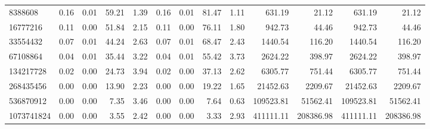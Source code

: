 \begin{tabular}{lrrrrrrrrrrrr}
8388608 & 0.16 & 0.01 & 59.21 & 1.39 & 0.16 & 0.01 & 81.47 & 1.11 & 631.19 & 21.12 & 631.19 & 21.12 \\
16777216 & 0.11 & 0.00 & 51.84 & 2.15 & 0.11 & 0.00 & 76.11 & 1.80 & 942.73 & 44.46 & 942.73 & 44.46 \\
33554432 & 0.07 & 0.01 & 44.24 & 2.63 & 0.07 & 0.01 & 68.47 & 2.43 & 1440.54 & 116.20 & 1440.54 & 116.20 \\
67108864 & 0.04 & 0.01 & 35.44 & 3.22 & 0.04 & 0.01 & 55.42 & 3.73 & 2624.22 & 398.97 & 2624.22 & 398.97 \\
134217728 & 0.02 & 0.00 & 24.73 & 3.94 & 0.02 & 0.00 & 37.13 & 2.62 & 6305.77 & 751.44 & 6305.77 & 751.44 \\
268435456 & 0.00 & 0.00 & 13.90 & 2.23 & 0.00 & 0.00 & 19.22 & 1.65 & 21452.63 & 2209.67 & 21452.63 & 2209.67 \\
536870912 & 0.00 & 0.00 & 7.35 & 3.46 & 0.00 & 0.00 & 7.64 & 0.63 & 109523.81 & 51562.41 & 109523.81 & 51562.41 \\
1073741824 & 0.00 & 0.00 & 3.55 & 2.42 & 0.00 & 0.00 & 3.33 & 2.93 & 411111.11 & 208386.98 & 411111.11 & 208386.98 \\
\bottomrule
\end{tabular}
